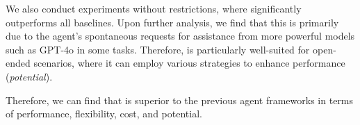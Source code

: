 We also conduct experiments without restrictions, where \framework significantly outperforms all baselines. Upon further analysis, we find that this is primarily due to the agent's spontaneous requests for assistance from more powerful models such as GPT-4o in some tasks. Therefore, \framework is particularly well-suited for open-ended scenarios, where it can employ various strategies to enhance performance (\textit{potential}).

Therefore, we can find that \framework{} is superior to the previous agent frameworks in terms of performance, flexibility, cost, and potential.
